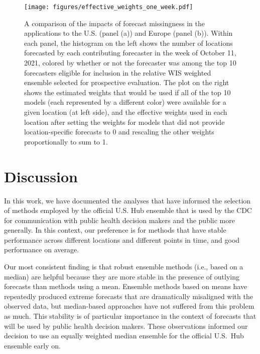 \documentclass[11pt,3p,review,authoryear]{elsarticle}
\begin{document}
\begin{figure}
\texttt{[image: figures/effective\_weights\_one\_week.pdf]}
\caption{A comparison of the impacts of forecast missingness in the applications to the U.S. (panel (a)) and Europe (panel (b)). Within each panel, the histogram on the left shows the number of locations forecasted by each contributing forecaster in the week of October 11, 2021, colored by whether or not the forecaster was among the top 10 forecasters eligible for inclusion in the relative WIS weighted ensemble selected for prospective evaluation. The plot on the right shows the estimated weights that would be used if all of the top 10 models (each represented by a different color) were available for a given location (at left side), and the effective weights used in each location after setting the weights for models that did not provide location-specific forecasts to 0 and rescaling the other weights proportionally to sum to 1.}
\label{fig:component_missingness}
\end{figure}

\section{Discussion}

In this work, we have documented the analyses that have informed the selection of methods employed by the official U.S. Hub ensemble that is used by the CDC for communication with public health decision makers and the public more generally. In this context, our preference is for methods that have stable performance across different locations and different points in time, and good performance on average.

Our most consistent finding is that robust ensemble methods (i.e., based on a median) are helpful because they are more stable in the presence of outlying forecasts than methods using a mean. Ensemble methods based on means have repeatedly produced extreme forecasts that are dramatically misaligned with the observed data, but median-based approaches have not suffered from this problem as much. This stability is of particular importance in the context of forecasts that will be used by public health decision makers. These observations informed our decision to use an equally weighted median ensemble for the official U.S.\ Hub ensemble early on.
\end{document}
